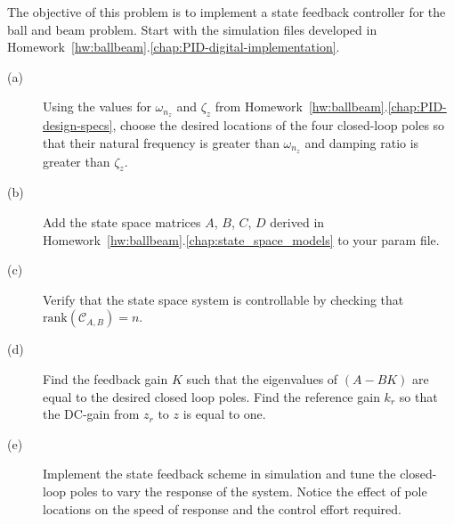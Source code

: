 The objective of this problem is to implement a state feedback controller for the ball and beam problem.  
Start with the simulation files developed in Homework~\ref{hw:ballbeam}.\ref{chap:PID-digital-implementation}.
\begin{description}
\item[(a)] Using the values for $\omega_{n_z}$ and $\zeta_z$ from Homework~\ref{hw:ballbeam}.\ref{chap:PID-design-specs}, choose the desired locations of the four closed-loop poles so that their natural frequency is greater than $\omega_{n_z}$ and damping ratio is greater than $\zeta_z$. 
\item[(b)] Add the state space matrices $A$, $B$, $C$, $D$ derived in Homework~\ref{hw:ballbeam}.\ref{chap:state_space_models} to your param file.
\item[(c)] Verify that the state space system is controllable by checking that $\text{rank}(\mathcal{C}_{A,B})=n$.
\item[(d)] Find the feedback gain $K$ such that the eigenvalues of $(A-BK)$ are equal to the desired closed loop poles.  Find the reference gain $k_r$ so that the DC-gain from $z_r$ to $z$ is equal to one.  
\item[(e)] Implement the state feedback scheme in simulation and tune the closed-loop poles to vary the response of the system. Notice the effect of pole locations on the speed of response and the control effort required.
\end{description}
